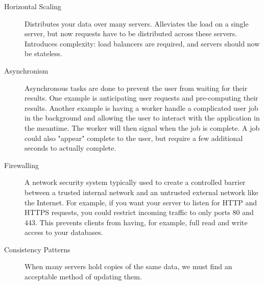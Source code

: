 \begin{description}
    \item[Horizontal Scaling] Distributes your data over many servers. Alleviates the load on a single server, but now requests have to be distributed across these servers. Introduces complexity: load balancers are required, and servers should now be stateless.
	
    \item[Asynchronism] Asynchronous tasks are done to prevent the user from waiting for their results. One example is anticipating user requests and pre-computing their results. Another example is having a worker handle a complicated user job in the background and allowing the user to interact with the application in the meantime. The worker will then signal when the job is complete. A job could also "appear" complete to the user, but require a few additional seconds to actually complete.
	
    \item[Firewalling] A network security system typically used to create a controlled barrier between a trusted internal network and an untrusted external network like the Internet. For example, if you want your server to listen for HTTP and HTTPS requests, you could restrict incoming traffic to only ports 80 and 443. This prevents clients from having, for example, full read and write access to your databases.
	
    \item[Consistency Patterns] When many servers hold copies of the same data, we must find an acceptable method of updating them.


\end{description}
